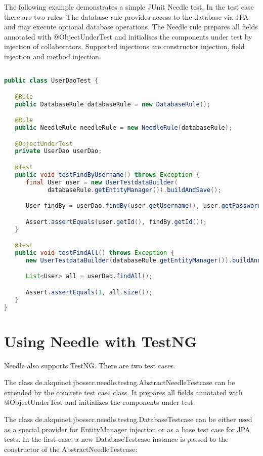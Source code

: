 The following example demonstrates a simple JUnit Needle test. In the test case there are two rules.
The database rule provides access to the database via JPA and may execute optional database operations.
The Needle rule prepares all fields annotated with @ObjectUnderTest and initialises the components under test by injection of collaborators.
Supported injections are constructor injection, field injection and method injection.

\begin{lstlisting}[language={JAVA},caption=JUnit User DAO test]

public class UserDaoTest {

   @Rule
   public DatabaseRule databaseRule = new DatabaseRule();

   @Rule
   public NeedleRule needleRule = new NeedleRule(databaseRule);

   @ObjectUnderTest
   private UserDao userDao;

   @Test
   public void testFindByUsername() throws Exception {
      final User user = new UserTestdataBuilder(
            databaseRule.getEntityManager()).buildAndSave();

      User findBy = userDao.findBy(user.getUsername(), user.getPassword());

      Assert.assertEquals(user.getId(), findBy.getId());
   }

   @Test
   public void testFindAll() throws Exception {
      new UserTestdataBuilder(databaseRule.getEntityManager()).buildAndSave();

      List<User> all = userDao.findAll();

      Assert.assertEquals(1, all.size());
   }
}
\end{lstlisting}

\section{Using Needle with TestNG}
\label{sec: TestNG}

Needle also supports TestNG. There are two test cases.

The class de.akquinet.jbosscc.needle.testng.AbstractNeedleTestcase can be extended by the concrete test case class.
It prepares all fields annotated with @ObjectUnderTest and initializes the components under test.

The class de.akquinet.jbosscc.needle.testng.DatabaseTestcase can be either used as a special provider for EntityManager injection or as a base test case for JPA tests.
In the first case, a new DatabaseTestcase instance is passed to the constructor of the AbstractNeedleTestcase:

